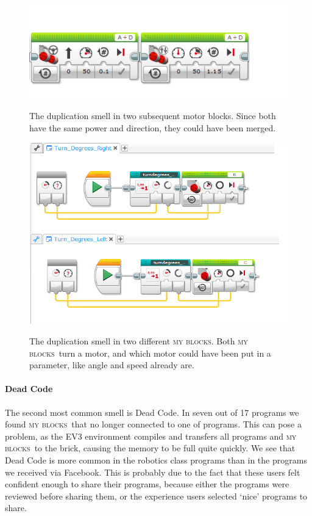 \documentclass{sig-alternate}
\newcommand{\mbs}{\textsc{my blocks}}
\begin{document}
\begin{figure} [ht]
\caption{The duplication smell in two subsequent motor blocks. Since both have the same power and direction, they could have been merged. }
\centering
\includegraphics[width=\columnwidth]{img/dup_ev3}
\label{fig:dup_ev3}
\end{figure}

\begin{figure} [ht]
\caption{The duplication smell in two different \mbs. Both \mbs~turn a motor, and which motor could have been put in a parameter, like angle and speed already are. }
\centering
\includegraphics[width=\columnwidth]{img/dup_ev3_myblocks}
\label{fig:dup_ev3_myblocks}
\end{figure}

\paragraph{Dead Code}
The second most common smell is Dead Code. In seven out of 17 programs we found \mbs~that no longer connected to one of programs. This can pose a problem, as the EV3 environment compiles and transfers all programs and \mbs~to the brick, causing the memory to be full quite quickly. We see that Dead Code is more common in the robotics class programs than in the programs we received via Facebook. This is probably due to the fact that these users felt confident enough to share their programs, because either the programs were reviewed before sharing them, or the experience users selected `nice' programs to share.
\end{document}

